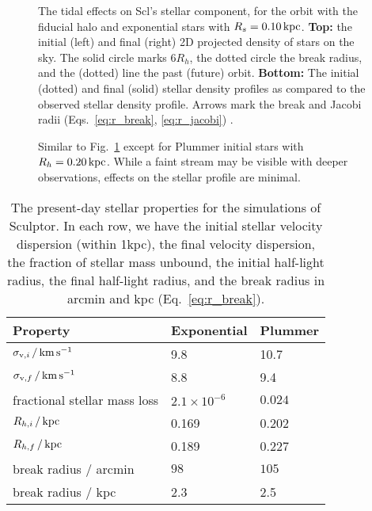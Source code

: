 \begin{figure}
\centering
{}
\caption[Sculptor initial and final density profiles]{The tidal effects
on Scl's stellar component, for the \smallperi{} orbit with the fiducial
halo and exponential stars with \(R_s=0.10\,{\rm kpc}\). \textbf{Top:} the
initial (left) and final (right) 2D projected density of stars on the
sky. The solid circle marks \(6R_h\), the dotted circle the break
radius, and the (dotted) line the past (future) orbit. \textbf{Bottom:}
The initial (dotted) and final (solid) stellar density profiles as
compared to the observed stellar density profile. Arrows mark the break
and Jacobi radii (Eqs.~\ref{eq:r_break}, \ref{eq:r_jacobi})
.}\label{fig:scl_smallperi_i_f}
\end{figure}

\begin{figure}
\centering
{}
\caption[Sculptor Plummer initial and final density profiles]{Similar to
Fig.~\ref{fig:scl_smallperi_i_f} except for Plummer initial stars with
\(R_h = 0.20\,{\rm kpc}\). While a faint stream may be visible with deeper
observations, effects on the stellar profile are
minimal.}\label{fig:scl_smallperi_plummer_i_f}
\end{figure}

\begin{table*}[t]
\centering
\caption[Simulation results for Sculptor’s stars]{The present-day stellar properties for the simulations of Sculptor. In each row, we have the initial stellar velocity dispersion (within 1kpc), the final velocity dispersion, the fraction of stellar mass unbound, the initial half-light radius, the final half-light radius, and the break radius in arcmin and kpc (Eq. \ref{eq:r_break}). }
\label{tbl:scl_sim_stars_results}
\begin{tabular}{lll}
\toprule
Property & Exponential & Plummer\\
\midrule
$\sigma_{{\rm v}, i}\,/\,{\rm km\,s^{-1}}$ & 9.8 & 10.7\\
$\sigma_{{\rm v}, f} \,/\,{\rm km\,s^{-1}}$ & 8.8 & 9.4\\
fractional stellar mass loss & $2.1\times 10^{-6}$ & $0.024$\\
$R_{h, i}\,/\,{\rm kpc}$ & 0.169 & 0.202\\
$R_{h, f}\,/\,{\rm kpc}$ & 0.189 & 0.227\\
break radius / arcmin & $98$ & $105$\\
break radius / kpc & 2.3 & 2.5\\
\bottomrule
\end{tabular}
\end{table*}

